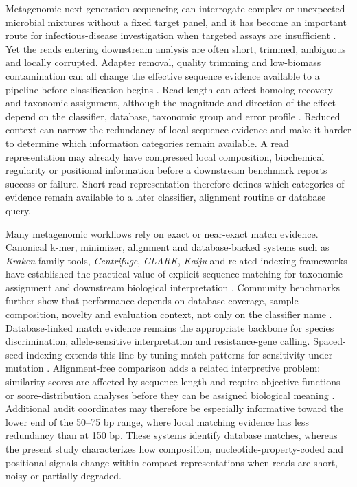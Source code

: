 Metagenomic next-generation sequencing can interrogate complex or unexpected microbial mixtures without a fixed target panel, and it has become an important route for infectious-disease investigation when targeted assays are insufficient \citep{Wilson2014,Wilson2019,Chiu2019}. Yet the reads entering downstream analysis are often short, trimmed, ambiguous and locally corrupted. Adapter removal, quality trimming and low-biomass contamination can all change the effective sequence evidence available to a pipeline before classification begins \citep{Martin2011,Bolger2014,Salter2014}. Read length can affect homolog recovery and taxonomic assignment, although the magnitude and direction of the effect depend on the classifier, database, taxonomic group and error profile \citep{Wommack2008,Pearman2020,Wood2014,Menzel2016}. Reduced context can narrow the redundancy of local sequence evidence and make it harder to determine which information categories remain available. A read representation may already have compressed local composition, biochemical regularity or positional information before a downstream benchmark reports success or failure. Short-read representation therefore defines which categories of evidence remain available to a later classifier, alignment routine or database query.

Many metagenomic workflows rely on exact or near-exact match evidence. Canonical k-mer, minimizer, alignment and database-backed systems such as \textit{Kraken}-family tools, \textit{Centrifuge}, \textit{CLARK}, \textit{Kaiju} and related indexing frameworks have established the practical value of explicit sequence matching for taxonomic assignment and downstream biological interpretation \citep{Wood2014,Wood2019,Ounit2015,Kim2016,Menzel2016}. Community benchmarks further show that performance depends on database coverage, sample composition, novelty and evaluation context, not only on the classifier name \citep{Sczyrba2017,Meyer2022}. Database-linked match evidence remains the appropriate backbone for species discrimination, allele-sensitive interpretation and resistance-gene calling. Spaced-seed indexing extends this line by tuning match patterns for sensitivity under mutation \citep{Brinda2015}. Alignment-free comparison adds a related interpretive problem: similarity scores are affected by sequence length and require objective functions or score-distribution analyses before they can be assigned biological meaning \citep{Swain2022AFScore}. Additional audit coordinates may therefore be especially informative toward the lower end of the 50--75 bp range, where local matching evidence has less redundancy than at 150 bp. These systems identify database matches, whereas the present study characterizes how composition, nucleotide-property-coded and positional signals change within compact representations when reads are short, noisy or partially degraded.


